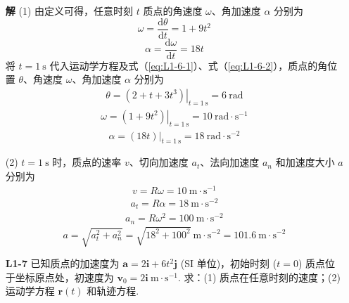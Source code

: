 \begin{enumerate}
	\textbf{解} \quad (1) 由定义可得，任意时刻 $t$ 质点的角速度 $\omega$、角加速度 $\alpha$ 分别为
	\begin{equation}\label{eq:L1-6-1}
		\omega = \frac{\mathrm{d}\theta}{\mathrm{d}t} = 1 + 9t^2
	\end{equation}
	\begin{equation}\label{eq:L1-6-2}
		\alpha = \frac{\mathrm{d}\omega}{\mathrm{d}t} = 18t
	\end{equation}
	将 $t = 1 \mathrm{\ s}$ 代入运动学方程及式（\ref{eq:L1-6-1}）、式（\ref{eq:L1-6-2}），质点的角位置 $\theta$、角速度 $\omega$、角加速度 $\alpha$ 分别为
	\begin{align*}
		\theta = \left.(2 + t + 3t^3)\right|_{t=1 \mathrm{\ s}} = 6 \mathrm{\ rad}
	\end{align*}
	\begin{align*}
		\omega = \left.(1 + 9t^2)\right|_{t=1 \mathrm{\ s}} = 10 \mathrm{\ rad \cdot s^{-1}}
	\end{align*}
	\begin{align*}
		\alpha = \left.(18t)\right|_{t=1 \mathrm{\ s}} = 18 \mathrm{\ rad \cdot s^{-2}}
	\end{align*}
	
	(2) $t = 1 \mathrm{\ s}$ 时，质点的速率 $v$、切向加速度 $a_t$、法向加速度 $a_n$ 和加速度大小 $a$ 分别为
	\begin{align*}
		v = R\omega = 10 \mathrm{\ m \cdot s^{-1}}
	\end{align*}
	\begin{align*}
		a_t = R\alpha = 18 \mathrm{\ m \cdot s^{-2}}
	\end{align*}
	\begin{align*}
		a_n = R\omega^2 = 100 \mathrm{\ m \cdot s^{-2}}
	\end{align*}
	\begin{equation}\label{eq:L1-6-3}
		a = \sqrt{a_t^2 + a_n^2} = \sqrt{18^2 + 100^2} \mathrm{\ m \cdot s^{-2}} = 101.6 \mathrm{\ m \cdot s^{-2}}
	\end{equation}
	
	\vspace {2em}
	
	\item [\textbf{L1-7}]
	\setcounter{equation}{0}
	\renewcommand{\theHequation}{L1-7.\arabic{equation}}
	\quad 已知质点的加速度为 $\boldsymbol{a} = 2\boldsymbol{i} + 6t^2\boldsymbol{j}$ (SI 单位)，初始时刻 ($t=0$) 质点位于坐标原点处，初速度为 $\boldsymbol{v}_0 = 2\boldsymbol{i} \mathrm{\ m \cdot s^{-1}}$. 求：(1) 质点在任意时刻的速度；(2) 运动学方程 $\boldsymbol{r}(t)$ 和轨迹方程.
	

\end{enumerate}
